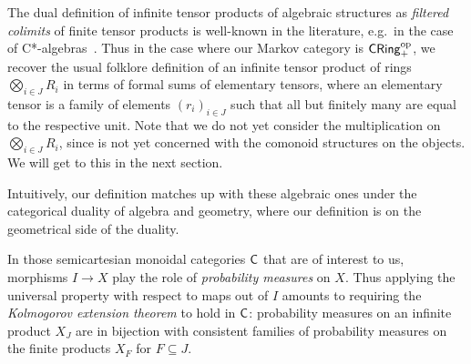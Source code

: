\documentclass[11pt]{article}
\begin{document}
\begin{example}
	\label{infprods_cring}
	The dual definition of infinite tensor products of algebraic structures as \emph{filtered colimits} of finite tensor products is well-known in the literature, e.g.~in the case of C*-algebras~\cite[p.~315]{blackadar}. Thus in the case where our Markov category is $\operatorname{\mathsf{CRing}}_+^{\mathrm{op}}$, we recover the usual folklore definition of an infinite tensor product of rings $\bigotimes_{i \in J} R_i$ in terms of formal sums of elementary tensors, where an elementary tensor is a family of elements $(r_i)_{i \in J}$ such that all but finitely many are equal to the respective unit. Note that we do not yet consider the multiplication on $\bigotimes_{i \in J} R_i$, since  is not yet concerned with the comonoid structures on the objects. We will get to this in the next section.
	
	Intuitively, our definition matches up with these algebraic ones under the categorical duality of algebra and geometry, where our definition is on the geometrical side of the duality.
\end{example}

\begin{remark}
	In those semicartesian monoidal categories $\mathsf{C}$ that are of interest to us, morphisms $I \to X$ play the role of \emph{probability measures} on $X$. Thus applying the universal property with respect to maps out of $I$ amounts to requiring the \emph{Kolmogorov extension theorem} to hold in $\mathsf{C}$: probability measures on an infinite product $X_J$ are in bijection with consistent families of probability measures on the finite products $X_F$ for $F \subseteq J$.
\end{remark}
\end{document}
